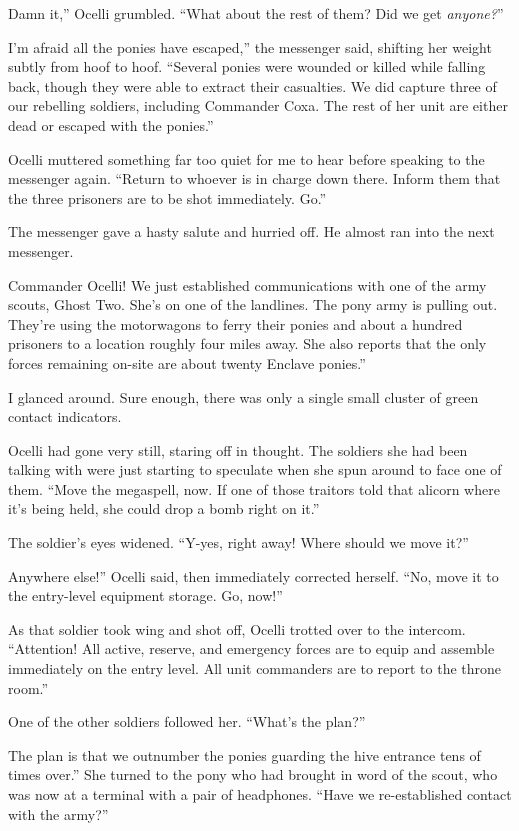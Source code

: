 \leavevmode{}Damn it,” Ocelli grumbled. “What about the rest of them? Did we get \textit{anyone?}”

\leavevmode{}I’m afraid all the ponies have escaped,” the messenger said, shifting her weight subtly from hoof to hoof. “Several ponies were wounded or killed while falling back, though they were able to extract their casualties. We did capture three of our rebelling soldiers, including Commander Coxa. The rest of her unit are either dead or escaped with the ponies.”

Ocelli muttered something far too quiet for me to hear before speaking to the messenger again. “Return to whoever is in charge down there. Inform them that the three prisoners are to be shot immediately. Go.”

The messenger gave a hasty salute and hurried off. He almost ran into the next messenger.

\leavevmode{}Commander Ocelli! We just established communications with one of the army scouts, Ghost Two. She’s on one of the landlines. The pony army is pulling out. They’re using the motorwagons to ferry their ponies and about a hundred prisoners to a location roughly four miles away. She also reports that the only forces remaining on-site are about twenty Enclave ponies.”

I glanced around. Sure enough, there was only a single small cluster of green contact indicators.

Ocelli had gone very still, staring off in thought. The soldiers she had been talking with were just starting to speculate when she spun around to face one of them. “Move the megaspell, now. If one of those traitors told that alicorn where it’s being held, she could drop a bomb right on it.”

The soldier’s eyes widened. “Y-yes, right away! Where should we move it?”

\leavevmode{}Anywhere else!” Ocelli said, then immediately corrected herself. “No, move it to the entry-level equipment storage. Go, now!”

As that soldier took wing and shot off, Ocelli trotted over to the intercom. “Attention! All active, reserve, and emergency forces are to equip and assemble immediately on the entry level. All unit commanders are to report to the throne room.”

One of the other soldiers followed her. “What’s the plan?”

\leavevmode{}The plan is that we outnumber the ponies guarding the hive entrance tens of times over.” She turned to the pony who had brought in word of the scout, who was now at a terminal with a pair of headphones. “Have we re-established contact with the army?”

